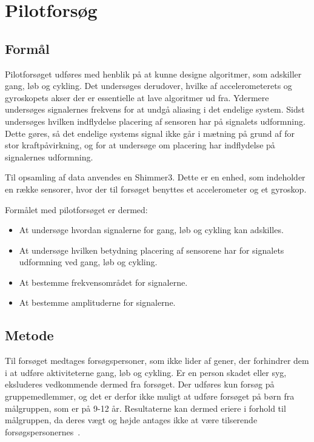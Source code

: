 \chapter{Pilotforsøg}\vspace{-.75cm}\label{pilot}
\section{Formål}
Pilotforsøget udføres med henblik på at kunne designe algoritmer, som adskiller gang, løb og cykling. Det undersøges derudover, hvilke af accelerometerets og gyroskopets akser der er essentielle at lave algoritmer ud fra. Ydermere undersøges signalernes frekvens for at undgå aliasing i det endelige system. Sidst undersøges hvilken indflydelse placering af sensoren har på signalets udformning. Dette gøres, så det endelige systems signal ikke går i mætning på grund af for stor kraftpåvirkning, og for at undersøge om placering har indflydelse på signalernes udformning.

Til opsamling af data anvendes en Shimmer3. Dette er en enhed, som indeholder en række sensorer, hvor der til forsøget benyttes et accelerometer og et gyroskop. 

Formålet med pilotforsøget er dermed:
\begin{itemize}
	\item At undersøge hvordan signalerne for gang, løb og cykling kan adskilles. 
	\item At undersøge hvilken betydning placering af sensorene har for signalets udformning ved gang, løb og cykling. 
	\item At bestemme frekvensområdet for signalerne.
	\item At bestemme amplituderne for signalerne.
\end{itemize}

\section{Metode}
Til forsøget medtages forsøgspersoner, som ikke lider af gener, der forhindrer dem i at udføre aktiviteterne gang, løb og cykling. Er en person skadet eller syg, eksluderes vedkommende dermed fra forsøget. Der udføres kun forsøg på gruppemedlemmer, og det er derfor ikke muligt at udføre forsøget på børn fra målgruppen, som er på 9-12 år. Resultaterne kan dermed eriere i forhold til målgruppen, da deres vægt og højde antages ikke at være tilserende forsøgspersonernes~\citep{Rigsholspitalet2014}. 

